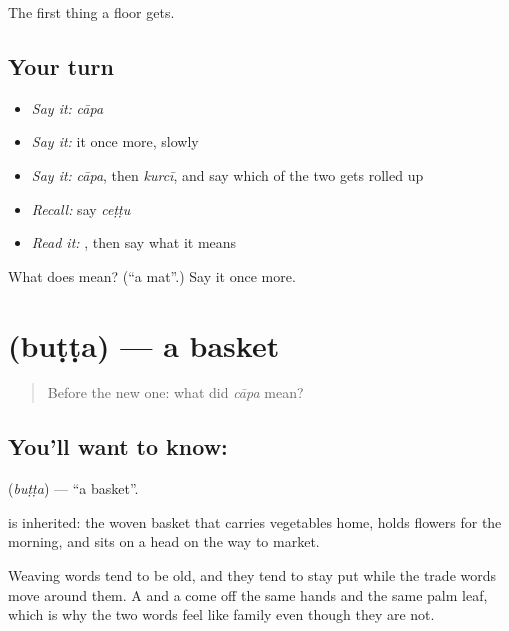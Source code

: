 \begin{grammarlens}[title={What you've built}]
The first thing a floor gets.
\end{grammarlens}

\subsection*{Your turn}
\begin{itemize}
\raggedright
  \item \emph{Say it:} \emph{cāpa}
  \item \emph{Say it:} it once more, slowly
  \item \emph{Say it:} \emph{cāpa}, then \emph{kurcī}, and say which of the two gets rolled up
  \item \emph{Recall:} say \emph{ceṭṭu}
  \item \emph{Read it:} \textbf{}, then say what it means
\end{itemize}

\begin{tcolorbox}[breakable,colback=teal!4,colframe=teal!35!black,title={Before you move on}]
What does  mean? (\textquotedblleft{}a mat\textquotedblright{}.) Say it once more.
\end{tcolorbox}
\section[\texorpdfstring{\te{బుట్ట} (buṭṭa)}{బుట్ట (buṭṭa)}]{ (buṭṭa) — a basket}

\label{lesson:TE-C56-basket}



\begin{quote}
Before the new one: what did \emph{cāpa} mean?
\end{quote}

\subsection*{You'll want to know: }
\textbf{} (\emph{buṭṭa}) — \textquotedblleft{}a basket\textquotedblright{}.

 is inherited: the woven basket that carries vegetables home, holds flowers for the morning, and sits on a head on the way to market.

Weaving words tend to be old, and they tend to stay put while the trade words move around them. A  and a  come off the same hands and the same palm leaf, which is why the two words feel like family even though they are not.

